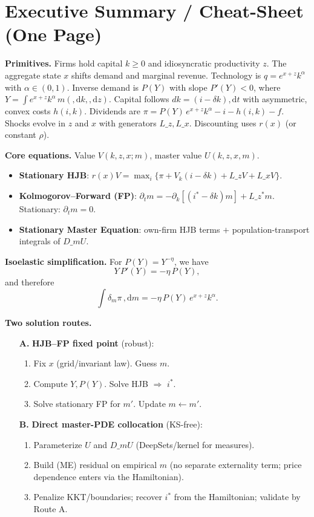 ﻿\documentclass[11pt,letterpaper,oneside]{article}
\numberwithin{equation}{section}
\newcommand{\1}{\mathbf{1}}
\newcommand{\diff}{,\mathrm{d}}
\newcommand{\Lz}{L\_z}
\newcommand{\Lx}{L\_x}
\newcommand{\Lzadj}{L\_z^{\!*}}
\newcommand{\dmU}{D\_m U}
\begin{document}
\section*{Executive Summary / Cheat-Sheet (One Page)}
\begin{tcolorbox}[didacticstyle]
\textbf{Primitives.} Firms hold capital $k\!\ge 0$ and idiosyncratic productivity $z$. The aggregate state $x$ shifts demand and marginal revenue. Technology is $q=e^{x+z}k^\alpha$ with $\alpha\in(0,1)$. Inverse demand is $P(Y)$ with slope $P'(Y)<0$, where $Y=\int e^{x+z}k^\alpha\,m(\diff k,\diff z)$. Capital follows $dk=(i-\delta k)\diff t$ with asymmetric, convex costs $h(i,k)$. Dividends are $\pi = P(Y)\,e^{x+z}k^\alpha - i - h(i,k) - f$. Shocks evolve in $z$ and $x$ with generators $\Lz,\Lx$. Discounting uses $r(x)$ (or constant $\rho$).
\medskip

\textbf{Core equations.} Value $V(k,z,x;m)$, master value $U(k,z,x,m)$.
\begin{itemize}[leftmargin=1.25em]
\item \textbf{Stationary HJB}: $r(x)V=\max_i\{\pi+V_k(i-\delta k)+\Lz V+\Lx V\}$.
\item \textbf{Kolmogorov--Forward (FP)}: $\partial_t m=-\partial_k[(i^*-\delta k)m]+\Lzadj m$. Stationary: $\partial_t m=0$.
\item \textbf{Stationary Master Equation}: own-firm HJB terms $+$ population-transport integrals of $\dmU$.

\end{itemize}


\textbf{Isoelastic simplification.} For $P(Y)=Y^{-\eta}$, we have
\[
Y\,P'(Y)=-\eta\,P(Y),
\]
and therefore
\[
\int \delta_m \pi\,\diff m = -\eta\,P(Y)\,e^{x+z}k^\alpha.
\]

\textbf{Two solution routes.}
\begin{enumerate}[leftmargin=1.25em]
\item[\textbf{A.}] \textbf{HJB--FP fixed point} (robust):
\begin{enumerate}[leftmargin=1em,label*=\arabic*.]
\item Fix $x$ (grid/invariant law). Guess $m$.
\item Compute $Y,P(Y)$. Solve HJB $\Rightarrow$ $i^*$.
\item Solve stationary FP for $m'$. Update $m\leftarrow m'$.
\end{enumerate}
\item[\textbf{B.}] \textbf{Direct master-PDE collocation} (KS-free):
\begin{enumerate}[leftmargin=1em,label*=\arabic*.]
\item Parameterize $U$ and $\dmU$ (DeepSets/kernel for measures).
\item Build (ME) residual on empirical $m$ (no separate externality term; price dependence enters via the Hamiltonian).
\item Penalize KKT/boundaries; recover $i^*$ from the Hamiltonian; validate by Route A.
\end{enumerate}
\end{enumerate}


\end{tcolorbox}
\end{document}
